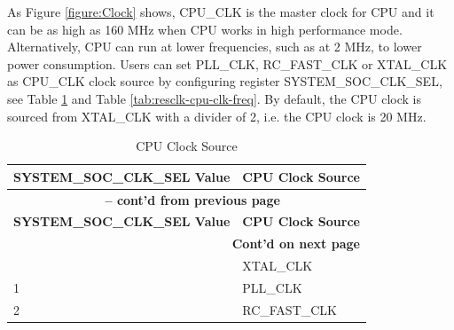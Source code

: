 \documentclass[main\_\_EN.tex]{subfiles}
\begin{document}
As Figure \ref{figure:Clock} shows, CPU\_CLK is the master clock for CPU and it can be as high as 160 MHz when CPU works in high performance mode. Alternatively, CPU can run at lower frequencies, such as at 2 MHz, to lower power consumption.
Users can set PLL\_CLK, RC\_FAST\_CLK or XTAL\_CLK as CPU\_CLK clock source by configuring register  SYSTEM\_SOC\_CLK\_SEL, see Table  \ref{tab:resclk-cpu-clk-src} and Table  \ref{tab:resclk-cpu-clk-freq}. By default, the CPU clock is sourced from XTAL\_CLK with a divider of 2, i.e. the CPU clock is 20 MHz.

\begin{longtable}[c]{|p{5cm}|p{4cm}| }
       \caption{CPU Clock Source}
		\label{tab:resclk-cpu-clk-src} \\
	    \hline
        \rowcolor{lightgray}
         \textbf{SYSTEM\_SOC\_CLK\_SEL Value} &  \textbf{CPU Clock Source} \\\hline
         \endfirsthead

       \multicolumn{2}{c}{\bfseries \tablename\ \thetable{} -- cont'd from previous page}\\\hline
       \rowcolor{lightgray}
         \textbf{SYSTEM\_SOC\_CLK\_SEL Value} &  \textbf{CPU Clock Source} \\\hline
         \endhead

    \multicolumn{2}{r}{\textbf{Cont'd on next page}} \\
    \endfoot
    \endlastfoot
    \hline
        0 & XTAL\_CLK \\
        \hline
        1 & PLL\_CLK \\
        \hline
        2 & RC\_FAST\_CLK \\
        \hline
\end{longtable}
\end{document}
